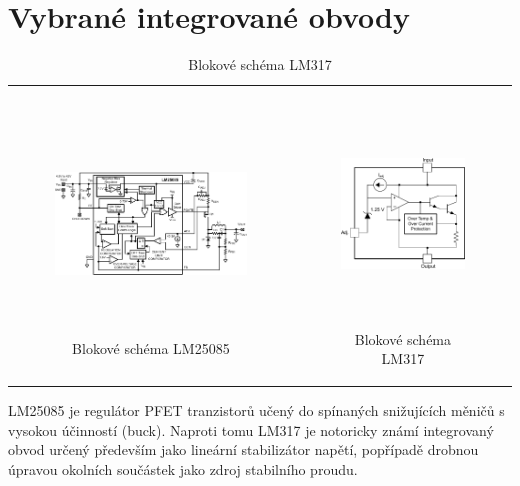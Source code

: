 \section{Vybrané integrované obvody}

\begin{table}[H]
	\begin{center}

		\begin{tabular}{cc}
			\begin{minipage}{0.5\textwidth}
				\begin{figure}[H]
					\centering
					\includegraphics[height=5.9cm]{img/LM25085.pdf}
					\caption{Blokové schéma LM25085}
					\label{graf:1}
				\end{figure}
			\end{minipage}

	&		
				
			\begin{minipage}{0.5\textwidth}
				\begin{figure}[H]
					\centering
					\includegraphics[height=5.9cm]{img/LM317.pdf}
					\caption{Blokové schéma LM317}
					\label{graf:1}
				\end{figure}
			\end{minipage}
		\end{tabular}
	\end{center}	
\end{table}

LM25085 je regulátor PFET tranzistorů učený do spínaných snižujících měničů s vysokou účinností (buck). Naproti tomu LM317 je notoricky známí integrovaný obvod určený především jako lineární stabilizátor napětí, popřípadě drobnou úpravou okolních součástek jako zdroj stabilního proudu.